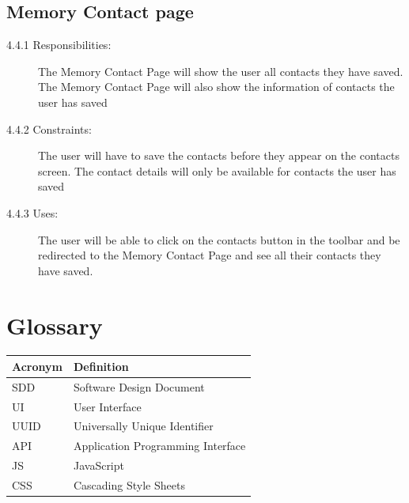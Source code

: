 \documentclass{article}
\begin{document}
\subsection{Memory Contact page}
\begin{description}
\item[4.4.1 Responsibilities:] The Memory Contact Page will show the user all contacts they have saved. The Memory Contact Page will also show the information of contacts the user has saved
\item[4.4.2 Constraints:] The user will have to save the contacts before they appear on the contacts screen. The contact details will only be available for contacts the user has saved
\item[4.4.3 Uses:] The user will be able to click on the contacts button in the toolbar and be redirected to the Memory Contact Page and see all their contacts they have saved.
\end{description}

\section{Glossary}
\begin{tabular}{|l|p{10cm}|}
\hline
\textbf{Acronym} & \textbf{Definition} \\ \hline
SDD & Software Design Document \\ \hline
UI & User Interface \\ \hline
UUID & Universally Unique Identifier \\ \hline
API & Application Programming Interface \\ \hline
JS & JavaScript \\ \hline
CSS & Cascading Style Sheets \\ \hline
\end{tabular}
\end{document}
